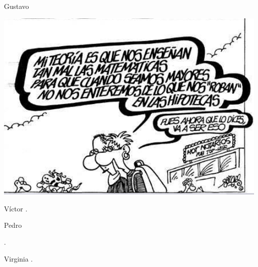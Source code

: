 \begin{opin}{\guscolor}{Gustavo}
\begin{minipage}[hbtp]{0.5\linewidth}
	\centering
	\includegraphics[width=0.8\linewidth]{img/chistegus.png}
\end{minipage}

\end{opin}

\begin{opin}{\victorcolor}{Víctor}
.


\end{opin}

\begin{opin}{\pedrocolor}{Pedro}

.


\end{opin}

\begin{opin}{\virgicolor}{Virginia}
.


\end{opin}
